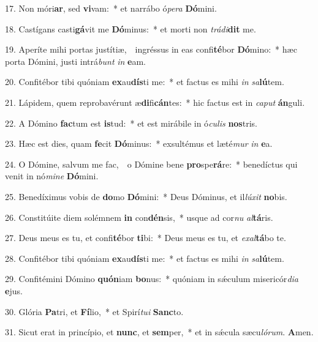 17. Non móri\textbf{ar}, sed \textbf{vi}vam:~* et narrábo ó\textit{pe}\textit{ra} \textbf{Dó}mini.

18. Castígans casti\textbf{gá}vit me \textbf{Dó}minus:~* et morti non \textit{trá}\textit{di}\textbf{dit} me.

19. Aperíte mihi portas justítiæ,~\GreDagger\ ingréssus in eas confi\textbf{té}bor \textbf{Dó}mino:~* hæc porta Dómini, justi intrá\textit{bunt} \textit{in} \textbf{e}am.

20. Confitébor tibi quóniam \textbf{ex}au\textbf{dís}ti me:~* et factus es mihi \textit{in} \textit{sa}\textbf{lú}tem.

21. Lápidem, quem reprobavérunt æ\textbf{di}fi\textbf{cán}tes:~* hic factus est in \textit{ca}\textit{put} \textbf{án}guli.

22. A Dómino \textbf{fac}tum est \textbf{is}tud:~* et est mirábile in ó\textit{cu}\textit{lis} \textbf{nos}tris.

23. Hæc est dies, quam \textbf{fe}cit \textbf{Dó}minus:~* exsultémus et læté\textit{mur} \textit{in} \textbf{e}a.

24. O Dómine, salvum me fac,~\GreDagger\ o Dómine bene \textbf{pro}spe\textbf{rá}re:~* benedíctus qui venit in nó\textit{mi}\textit{ne} \textbf{Dó}mini.

25. Benedíximus vobis de \textbf{do}mo \textbf{Dó}mini:~* Deus Dóminus, et il\textit{lú}\textit{xit} \textbf{no}bis.

26. Constitúite diem solémnem \textbf{in} con\textbf{dén}sis,~* usque ad cor\textit{nu} \textit{al}\textbf{tá}ris.

27. Deus meus es tu, et confi\textbf{té}bor \textbf{ti}bi:~* Deus meus es tu, et \textit{ex}\textit{al}\textbf{tá}bo te.

28. Confitébor tibi quóniam \textbf{ex}au\textbf{dís}ti me:~* et factus es mihi \textit{in} \textit{sa}\textbf{lú}tem.

29. Confitémini Dómino \textbf{quón}iam \textbf{bo}nus:~* quóniam in s\'{\ae}culum misericór\textit{di}\textit{a} \textbf{e}jus.

30. Glória \textbf{Pa}tri, et \textbf{Fí}lio,~* et Spirí\textit{tu}\textit{i} \textbf{Sanc}to.

31. Sicut erat in princípio, et \textbf{nunc}, et \textbf{sem}per,~* et in s\'{\ae}cula sæcu\textit{ló}\textit{rum}. \textbf{A}men.